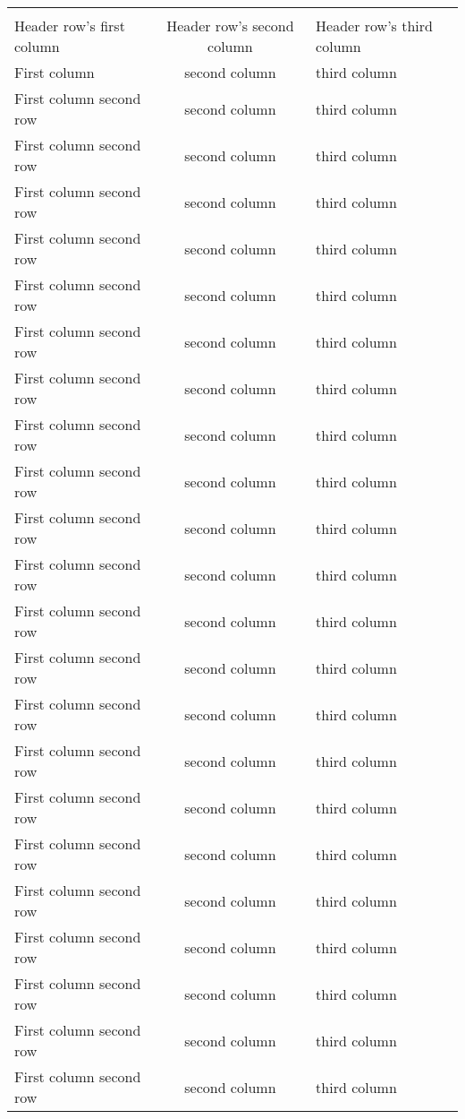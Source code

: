 \documentclass[12pt,a4paper]{beamer}
\begin{document}
\begin{table}
\caption{My favorite table} \label{table:ten}
\begin{longtable}{|l|c|p{4cm}|}
\hline  \\ %
Header row's first column & 
Header row's second column & 
Header row's third column \\
\hline \hline
First column & second column & third column \\
First column second row & second column & third column \\
First column second row & second column & third column \\
First column second row & second column & third column \\
First column second row & second column & third column \\
First column second row & second column & third column \\
First column second row & second column & third column \\
First column second row & second column & third column \\
First column second row & second column & third column \\
First column second row & second column & third column \\
First column second row & second column & third column \\
First column second row & second column & third column \\
First column second row & second column & third column \\
First column second row & second column & third column \\
First column second row & second column & third column \\
First column second row & second column & third column \\
First column second row & second column & third column \\
First column second row & second column & third column \\
First column second row & second column & third column \\
First column second row & second column & third column \\
First column second row & second column & third column \\
First column second row & second column & third column \\
First column second row & second column & third column \\

\end{longtable}
\end{table}
\end{document}
